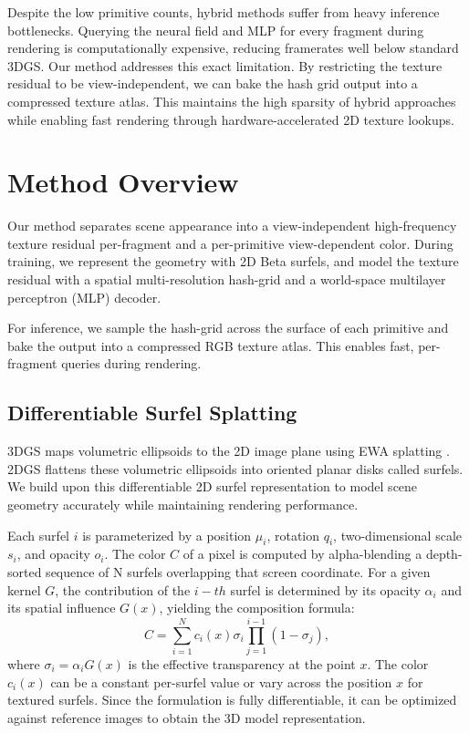 \documentclass[acmtog,anonymous,review]{acmart}
\begin{document}
Despite the low primitive counts, hybrid methods suffer from heavy inference bottlenecks. Querying the neural field and MLP for every fragment during rendering is computationally expensive, reducing framerates well below standard 3DGS. Our method addresses this exact limitation. By restricting the texture residual to be view-independent, we can bake the hash grid output into a compressed texture atlas. This maintains the high sparsity of hybrid approaches while enabling fast rendering through hardware-accelerated 2D texture lookups.

\section{Method Overview}

Our method separates scene appearance into a view-independent high-frequency
texture residual per-fragment and a per-primitive view-dependent color. During training, we represent
the geometry with 2D Beta surfels, and model the texture residual with a spatial
multi-resolution hash-grid and a world-space multilayer perceptron (MLP) decoder.

For inference, we sample the hash-grid across the surface of each primitive and bake the
output into a compressed RGB texture atlas. This enables fast, per-fragment queries during rendering.

\subsection{Differentiable Surfel Splatting}

3DGS \cite{kerbl_3d_2023} maps volumetric ellipsoids to the 2D image
plane using EWA splatting \cite{zwicker2002}. 2DGS \cite{} flattens these volumetric ellipsoids into oriented planar disks called surfels. We build upon this differentiable 2D surfel representation to model scene geometry accurately while maintaining rendering performance.

Each surfel $i$ is parameterized by a position $\mu_i$, rotation $q_i$,
two-dimensional scale $s_i$, and opacity $o_i$. The color $C$ of a pixel is computed
by alpha-blending a depth-sorted sequence of N surfels overlapping that screen
coordinate. For a given kernel $G$, the contribution of the $i-th$ surfel is
determined by its opacity $\alpha_i$ and its spatial influence $G(x)$, yielding the
composition formula: 
\begin{equation} C = \sum_{i=1}^{N} c_i(x) \sigma_i
\prod_{j=1}^{i-1} (1 - \sigma_j), 
\end{equation}
where $\sigma_i = \alpha_i G(x)$
is the effective transparency at the point $x$. The color $c_i(x)$ can be a constant
per-surfel value or vary across the position $x$ for textured surfels. Since the
formulation is fully differentiable, 
it can be optimized against reference images to obtain the 3D model representation.
\end{document}
